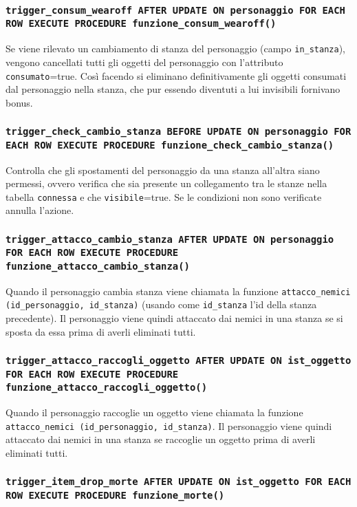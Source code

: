 \documentclass[10pt,a4paper]{article}
\begin{document}
\subsubsection{\texttt{trigger\_consum\_wearoff AFTER UPDATE ON personaggio FOR EACH ROW EXECUTE PROCEDURE funzione\_consum\_wearoff()}}
Se viene rilevato un cambiamento di stanza del personaggio (campo \texttt{in\_stanza}), vengono cancellati tutti gli oggetti del personaggio con l'attributo \texttt{consumato}=true. Così facendo si eliminano definitivamente gli oggetti consumati dal personaggio nella stanza, che pur essendo diventuti a lui invisibili fornivano bonus.

\subsubsection{\texttt{trigger\_check\_cambio\_stanza BEFORE UPDATE ON personaggio FOR EACH ROW EXECUTE PROCEDURE funzione\_check\_cambio\_stanza()}}
Controlla che gli spostamenti del personaggio da una stanza all'altra siano permessi, ovvero verifica che sia presente un collegamento tra le stanze nella tabella \texttt{connessa} e che \texttt{visibile}=true. Se le condizioni non sono verificate annulla l'azione.

\subsubsection{\texttt{trigger\_attacco\_cambio\_stanza AFTER UPDATE ON personaggio FOR EACH ROW EXECUTE PROCEDURE funzione\_attacco\_cambio\_stanza()}}
Quando il personaggio cambia stanza viene chiamata la funzione \texttt{attacco\_nemici (id\_personaggio, id\_stanza)} (usando come \texttt{id\_stanza} l'id della stanza precedente). Il personaggio viene quindi attaccato dai nemici in una stanza se si sposta da essa prima di averli eliminati tutti.

\subsubsection{\texttt{trigger\_attacco\_raccogli\_oggetto AFTER UPDATE ON ist\_oggetto FOR EACH ROW EXECUTE PROCEDURE funzione\_attacco\_raccogli\_oggetto()}}
Quando il personaggio raccoglie un oggetto viene chiamata la funzione \texttt{attacco\_nemici (id\_personaggio, id\_stanza)}. Il personaggio viene quindi attaccato dai nemici in una stanza se raccoglie un oggetto prima di averli eliminati tutti.

\subsubsection{\texttt{trigger\_item\_drop\_morte AFTER UPDATE ON ist\_oggetto FOR EACH ROW EXECUTE PROCEDURE funzione\_morte()}}
\end{document}

